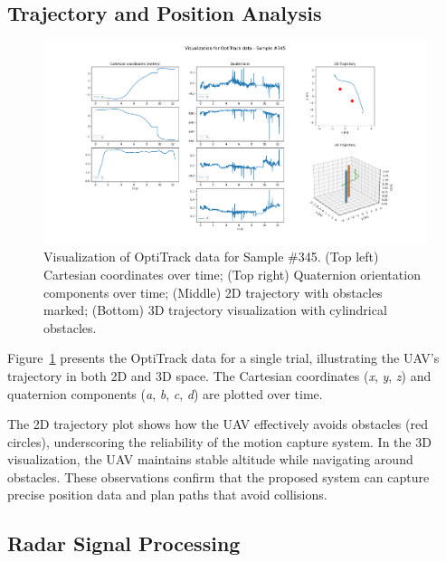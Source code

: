 \documentclass[12pt,a4paper]{article}
\begin{document}
\subsection{Trajectory and Position Analysis}

\begin{figure}[h!]
    \centering
    \includegraphics[width=\textwidth]{OptiTrack_sample_345.png}
    \caption{Visualization of OptiTrack data for Sample \#345. (Top left) Cartesian coordinates over time; (Top right) Quaternion orientation components over time; (Middle) 2D trajectory with obstacles marked; (Bottom) 3D trajectory visualization with cylindrical obstacles.}
    \label{fig:OptiTrack}
\end{figure}

Figure~\ref{fig:OptiTrack} presents the OptiTrack data for a single trial, illustrating the UAV's trajectory in both 2D and 3D space. The Cartesian coordinates (\textit{x}, \textit{y}, \textit{z}) and quaternion components (\textit{a}, \textit{b}, \textit{c}, \textit{d}) are plotted over time. 

The 2D trajectory plot shows how the UAV effectively avoids obstacles (red circles), underscoring the reliability of the motion capture system. In the 3D visualization, the UAV maintains stable altitude while navigating around obstacles. These observations confirm that the proposed system can capture precise position data and plan paths that avoid collisions.

\subsection{Radar Signal Processing}
\end{document}
